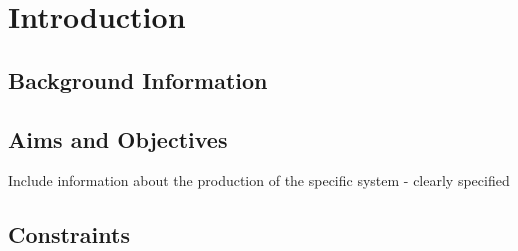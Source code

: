 
\chapter{Introduction} %

\label{Chapter2} %

\section{Background Information}

\section{Aims and Objectives}

Include information about the production of the specific system - clearly specified

\section{Constraints}
